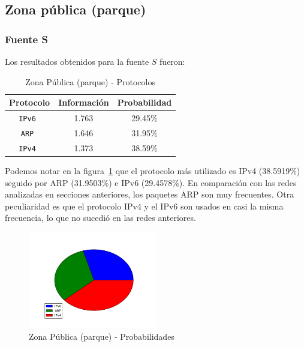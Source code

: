 \documentclass[final,inline,narroweqnarray,a4paper]{ieee}
\begin{document}
\subsection{Zona pública (parque)}
\subsubsection{Fuente S}

Los resultados obtenidos para la fuente $S$ fueron:

\begin{table}[H]
    \begin{center}
        \begin{tabular}{|c|c|c|}
            \hline
            \textbf{Protocolo} & \textbf{Información} & \textbf{Probabilidad} \\ \hline
            \texttt{IPv6      }& 1.763        & 29.45\%    \\ \hline
            \texttt{ARP       }& 1.646        & 31.95\%     \\ \hline
            \texttt{IPv4      }& 1.373        & 38.59\%    \\ \hline
        \end{tabular}
        \caption{Zona Pública (parque) - Protocolos}
        \label{table:parqueS}
    \end{center}
\end{table} 

Podemos notar en la figura~\ref{torta:parqueS} que el protocolo más utilizado es IPv4 (38.5919\%) seguido por ARP (31.9503\%) e IPv6 (29.4578\%). En comparación con las redes analizadas en secciones anteriores, los paquetes ARP son muy frecuentes. Otra peculiaridad es que el protocolo IPv4 y el IPv6 son usados en casi la misma frecuencia, lo que no sucedió en las redes anteriores.

\begin{figure}[H]
    \begin{center}
        \includegraphics[width=0.5\textwidth]{plot/parqueS-pie.png}
        \caption{Zona Pública (parque) - Probabilidades}
        \label{torta:parqueS}
    \end{center}
\end{figure}
\end{document}
